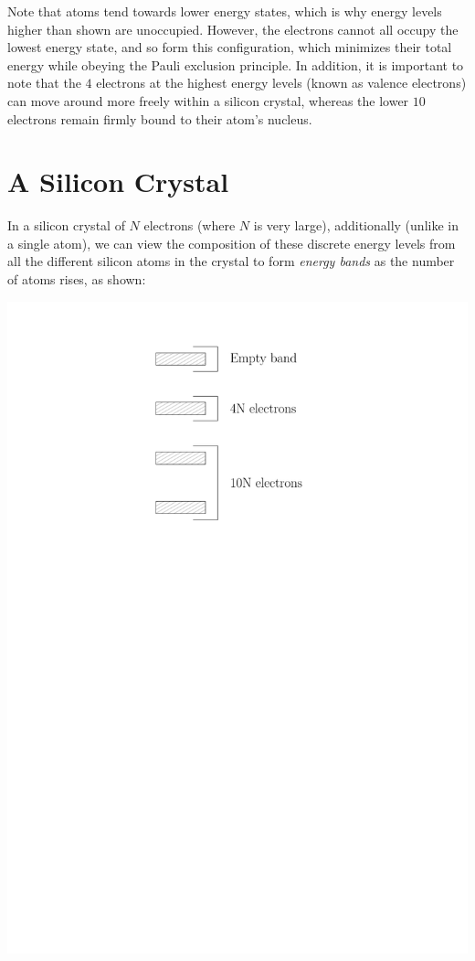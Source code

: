 \documentclass[letterpaper]{article}
\theoremstyle{remark}
\begin{document}
Note that atoms tend towards lower energy states, which is why energy levels higher than shown are unoccupied. However, the electrons cannot all occupy the lowest energy state, and so form this configuration, which minimizes their total energy while obeying the Pauli exclusion principle. In addition, it is important to note that the $4$ electrons at the highest energy levels (known as valence electrons) can move around more freely within a silicon crystal, whereas the lower $10$ electrons remain firmly bound to their atom's nucleus.

\section{A Silicon Crystal}

In a silicon crystal of $N$ electrons (where $N$ is very large), additionally (unlike in a single atom), we can view the composition of these discrete energy levels from all the different silicon atoms in the crystal to form \emph{energy bands} as the number of atoms rises, as shown:
\begin{center}
    \includegraphics[scale=0.7]{si_crystal.pdf}
\end{center}
\end{document}
